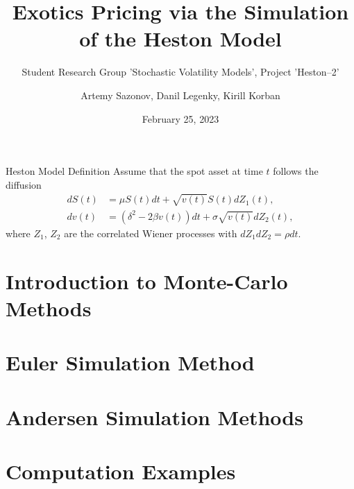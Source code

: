 \documentclass[aspectratio=169]{beamer}
\subtitle{Student Research Group 'Stochastic Volatility Models', Project 'Heston--2'}
\title{Exotics Pricing via the Simulation of the Heston Model}
\author{Artemy Sazonov, Danil Legenky, Kirill Korban}
\institute{Lomonosov Moscow State Univesity, Faculty of Mechanics and Mathematics}
\date{February 25, 2023}
\begin{document}
    \maketitle

    \begin{frame}{Heston Model Definition}
        Assume that the spot asset at time $t$ follows the diffusion
        \begin{align}
            dS(t) & = \mu S(t)dt + \sqrt{v(t)} S(t) dZ_1(t), \label{Heston:price}\\
            dv(t) & = \left(\delta^2 - 2\beta v(t)\right) dt + \sigma\sqrt{v(t)} dZ_2(t), \label{Heston:variance}
        \end{align}
        where $Z_1$, $Z_2$ are the correlated Wiener processes with $dZ_1dZ_2 = \rho dt$.
    \end{frame}

    \section{Introduction to Monte-Carlo Methods}
        

    \section{Euler Simulation Method}
        

    \section{Andersen Simulation Methods}
        

    \section{Computation Examples}
        
\end{document}
